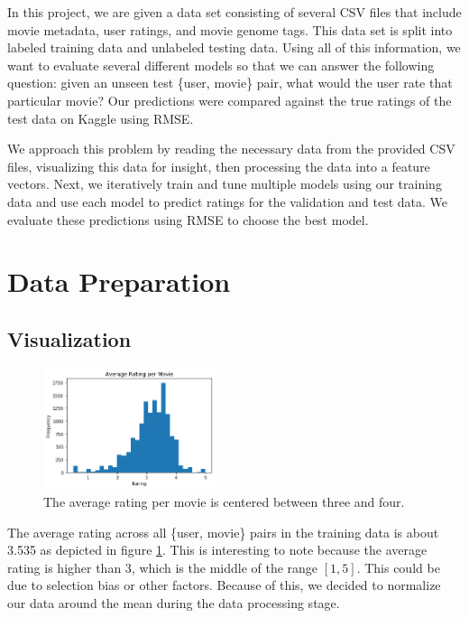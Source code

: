 \documentclass{sig-alternate-05-2015}
\begin{document}
In this project, we are given a data set consisting of several CSV files that include movie metadata,
user ratings, and movie genome tags. This data set is split into labeled training data and unlabeled
testing data. Using all of this information, we want to evaluate several different
models so that we can answer the following question: given an unseen test \{user, movie\} pair, what would the
user rate that particular movie? Our predictions were compared against the true ratings
of the test data on Kaggle using RMSE.

We approach this problem by reading the necessary data from the provided CSV files, visualizing this data for
insight, then processing the data into a feature vectors. Next, we iteratively
train and tune multiple models using our training data and use each model to predict ratings for the validation
and test data. We evaluate these predictions using RMSE to choose the best model.

\section{Data Preparation}

\subsection{Visualization}

\begin{figure}
    \begin{center}
        \includegraphics[width=2in]{AverageRatingByMovie.png}
        \caption{The average rating per movie is centered between three and four.}
        \label{averagemovieratings}
    \end{center}
\end{figure}

The average rating across all \{user, movie\} pairs in the training data is about 3.535 as depicted in
figure \ref{averagemovieratings}. This is interesting to note because the average rating is higher than 3, which
is the middle of the range \([1,5]\). This could be due to selection bias or other factors.
Because of this, we decided to normalize our data around the mean during the data processing stage.
\end{document}
